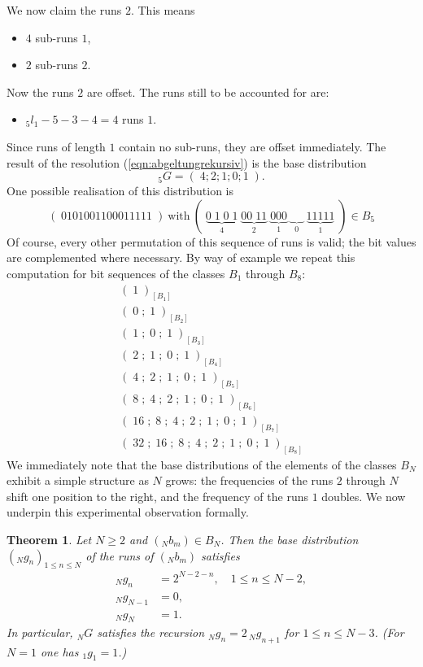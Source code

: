 \documentclass[11pt,a4paper]{scrartcl}
\theoremstyle{plain}
\newtheorem{satz}{Theorem}
\theoremstyle{definition}
\theoremstyle{remark}
\begin{document}
We now claim the runs $2$. This means
\begin{itemize}
  \item $4$ sub-runs $1$,
  \item $2$ sub-runs $2$.
\end{itemize}
Now the runs $2$ are offset. The runs still to be accounted for are:
\begin{itemize}
  \item $_5l_1-5-3-4=4$ runs $1$.
\end{itemize}
Since runs of length $1$ contain no sub-runs, they are offset
immediately. The result of the resolution
(\ref{eqn:abgeltungrekursiv}) is the base distribution
\begin{equation}
  _5G=(\;4;2;1;0;1\;).
\end{equation}
One possible realisation of this distribution is
\begin{equation}\label{eqn:folfgeausb5}
  (\;0101001100011111\;)\ \text{with}\
  (\;\underbrace{ 0\; 1\; 0\; 1}_{4}\;
   \underbrace{00\; 11}_{2}\;
   \underbrace{000}_{1}\;
   \underbrace{\;\;\;\;}_{0}\;
   \underbrace{11111}_{1}\; )\in B_5
\end{equation}
Of course, every other permutation of this sequence of runs is valid;
the bit values are complemented where necessary. By way of example we
repeat this computation for bit sequences of the classes $B_1$
through $B_8$:
\begin{align}
  (\;1\;)_{[B_1]}\label{eqn:folfgeausb1}\\
  (\;0\;;\;1\;)_{[B_2]}\nonumber\\
  (\;1\;;\;0\;;\;1\;)_{[B_3]}\nonumber\\
  (\;2\;;\;1\;;\;0\;;\;1\;)_{[B_4]}\nonumber\\
  (\;4\;;\;2\;;\;1\;;\;0\;;\;1\;)_{[B_5]}\nonumber\\
  (\;8\;;\;4\;;\;2\;;\;1\;;\;0\;;\;1\;)_{[B_6]}\nonumber\\
  (\;16\;;\;8\;;\;4\;;\;2\;;\;1\;;\;0\;;\;1\;)_{[B_7]}\nonumber\\
  (\;32\;;\;16\;;\;8\;;\;4\;;\;2\;;\;1\;;\;0\;;\;1\;)_{[B_8]}
  \label{eqn:folfgeausb8}
\end{align}
We immediately note that the base distributions of the elements of
the classes $B_N$ exhibit a simple structure as $N$ grows: the
frequencies of the runs $2$ through $N$ shift one position to the
right, and the frequency of the runs $1$ doubles. We now underpin this
experimental observation formally.

\begin{satz}\label{satz:grundverteilung}
Let $N\geq 2$ and $(_Nb_m)\in B_N$. Then the base distribution
$(_Ng_n)_{1\leq n\leq N}$ of the runs of $(_Nb_m)$ satisfies
\begin{align}
  _Ng_n&=2^{N-2-n},\quad 1\leq n\leq N-2,\label{eqn:gnform}\\
  _Ng_{N-1}&=0,\label{eqn:g_nminus1}\\
  _Ng_N&=1.\label{eqn:g_n}
\end{align}
In particular, $_NG$ satisfies the recursion
$_Ng_n=2\,{_Ng}_{n+1}$ for $1\leq n\leq N-3$. (For $N=1$ one has
$_1g_1=1$.)
\end{satz}
\end{document}
